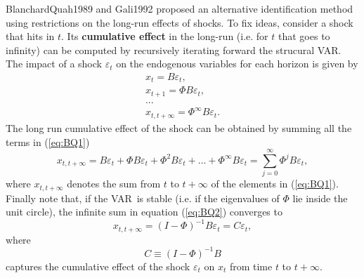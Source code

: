 \documentclass[10pt]{article}
\begin{document}
BlanchardQuah1989 and Gali1992 proposed an alternative identification method
using restrictions on the long-run effects of shocks. To fix ideas, consider
a shock that hits in $t$. Its \textbf{cumulative effect} in the long-run
(i.e. for $t$ that goes to infinity) can be computed by recursively
iterating forward the strucural VAR. The impact of a shock $\varepsilon _{t}$
on the endogenous variables for each horizon is given by%
\begin{equation}
\begin{array}{l}
x_{t}=B\varepsilon _{t}, \\
x_{t+1}=\Phi B\varepsilon _{t}, \\
... \\
x_{t,t+\infty }=\Phi ^{\infty }B\varepsilon _{t}.%
\end{array}
\label{eq:BQ1}
\end{equation}%
The long run cumulative effect of the shock can be obtained by summing all
the terms in (\ref{eq:BQ1})%
\begin{equation}
x_{t,t+\infty }=B\varepsilon _{t}+\Phi B\varepsilon _{t}+\Phi
^{2}B\varepsilon _{t}+...+\Phi ^{\infty }B\varepsilon
_{t}=\sum\limits_{j=0}^{\infty }\Phi ^{j}B\varepsilon _{t},  \label{eq:BQ2}
\end{equation}%
where $x_{t,t+\infty }$ denotes the sum from $t$ to $t+\infty $ of the
elements in (\ref{eq:BQ1}). Finally note that, if the VAR\ is stable (i.e.
if the eigenvalues of $\Phi $ lie inside the unit circle), the infinite sum
in equation (\ref{eq:BQ2}) converges to%
\begin{equation}
x_{t,t+\infty }=\left( I-\Phi \right) ^{-1}B\varepsilon _{t}=C\varepsilon
_{t},  \label{eq:BQ3}
\end{equation}%
where
\begin{equation}
C\equiv \left( I-\Phi \right) ^{-1}B  \label{eq:BQ4}
\end{equation}%
captures the cumulative effect of the shock $\varepsilon _{t}$ on $x_{t}$
from time $t$ to $t+\infty $.
\end{document}
